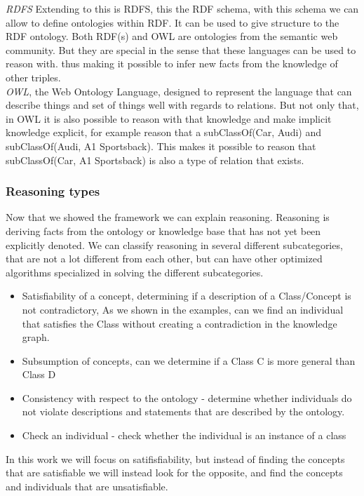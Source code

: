 \documentclass{article}
\begin{document}
\textit{RDFS} \cite{} Extending to this is RDFS, this the RDF schema, with this schema we can allow to define ontologies within RDF. It can be used to give structure to the RDF ontology. Both RDF(s) and OWL are ontologies from the semantic web community. But they are special in the sense that these languages can be used to reason with. thus making it possible to infer new facts from the knowledge of other triples.\\

\textit{OWL}\cite{OWLPrimer:2012}, the Web Ontology Language, designed to represent the language that can describe things and set of things well with regards to relations. But not only that, in OWL it is also possible to reason with that knowledge and make implicit knowledge explicit, for example reason that a subClassOf(Car, Audi) and subClassOf(Audi, A1 Sportsback). This makes it possible to reason that subClassOf(Car, A1 Sportsback) is also a type of relation that exists. 

\subsubsection{Reasoning types}
Now that we showed the framework we can explain reasoning. Reasoning is deriving facts from the ontology or knowledge base that has not yet been explicitly denoted. We can classify reasoning in several different subcategories, that are not a lot different from each other, but can have other optimized algorithms specialized in solving the different subcategories.

\begin{itemize}
	\item Satisfiability of a concept, determining if a description of a Class/Concept is not contradictory, As we shown in the examples, can we find an individual that satisfies the Class without creating a contradiction in the knowledge graph. 
	\item Subsumption of concepts, can we determine if a Class C is more general than Class D
	\item Consistency with respect to the ontology - determine whether individuals do not violate descriptions and statements that are described by the ontology.
 	\item Check an individual - check whether the individual is an instance of a class
\end{itemize}

In this work we will focus on satifisfiability, but instead of finding the concepts that are satisfiable we will instead look for the opposite, and find the concepts and individuals that are unsatisfiable. 
\end{document}
